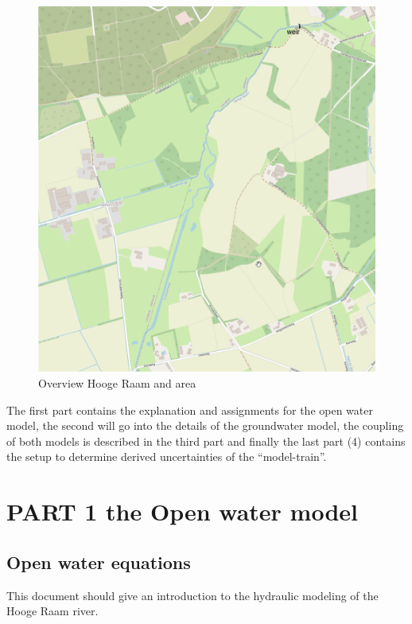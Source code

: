 \documentclass[
]{article}
\begin{document}
\begin{figure}
\centering
\includegraphics{Hooge-raam_overview.png}
\caption{Overview Hooge Raam and area}
\end{figure}

The first part contains the explanation and assignments for the open
water model, the second will go into the details of the groundwater
model, the coupling of both models is described in the third part and
finally the last part (4) contains the setup to determine derived
uncertainties of the ``model-train''.

\hypertarget{part-1-the-open-water-model}{%
\section{PART 1 the Open water
model}\label{part-1-the-open-water-model}}

\hypertarget{open-water-equations}{%
\subsection{Open water equations}\label{open-water-equations}}

This document should give an introduction to the hydraulic modeling of
the Hooge Raam river.
\end{document}
